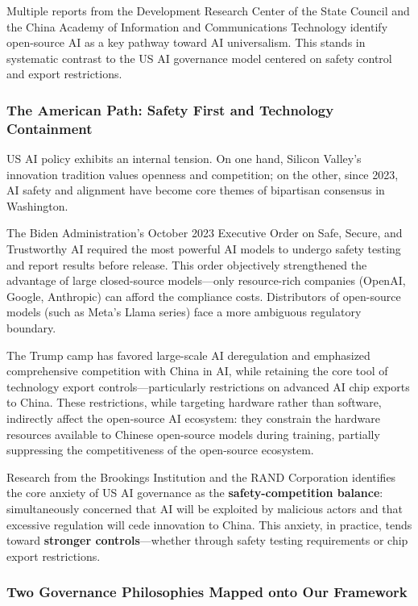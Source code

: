 Multiple reports from the Development Research Center of the State Council and the China Academy of Information and Communications Technology identify open-source AI as a key pathway toward AI universalism. This stands in systematic contrast to the US AI governance model centered on safety control and export restrictions.

\subsubsection{The American Path: Safety First and Technology Containment}

US AI policy exhibits an internal tension. On one hand, Silicon Valley's innovation tradition values openness and competition; on the other, since 2023, AI safety and alignment have become core themes of bipartisan consensus in Washington.

The Biden Administration's October 2023 Executive Order on Safe, Secure, and Trustworthy AI required the most powerful AI models to undergo safety testing and report results before release. This order objectively strengthened the advantage of large closed-source models---only resource-rich companies (OpenAI, Google, Anthropic) can afford the compliance costs. Distributors of open-source models (such as Meta's Llama series) face a more ambiguous regulatory boundary.

The Trump camp has favored large-scale AI deregulation and emphasized comprehensive competition with China in AI, while retaining the core tool of technology export controls---particularly restrictions on advanced AI chip exports to China. These restrictions, while targeting hardware rather than software, indirectly affect the open-source AI ecosystem: they constrain the hardware resources available to Chinese open-source models during training, partially suppressing the competitiveness of the open-source ecosystem.

Research from the Brookings Institution and the RAND Corporation identifies the core anxiety of US AI governance as the \textbf{safety-competition balance}: simultaneously concerned that AI will be exploited by malicious actors and that excessive regulation will cede innovation to China. This anxiety, in practice, tends toward \textbf{stronger controls}---whether through safety testing requirements or chip export restrictions.

\subsubsection{Two Governance Philosophies Mapped onto Our Framework}

